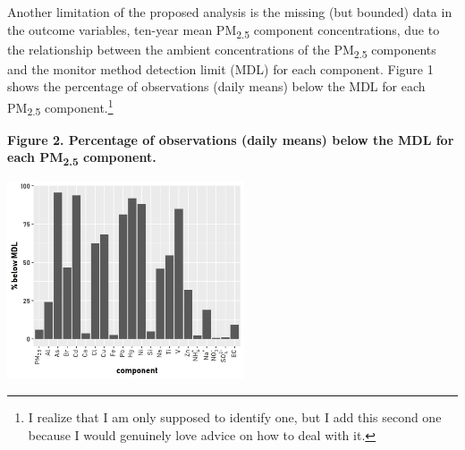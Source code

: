 \documentclass{article}\usepackage[]{graphicx}\usepackage[]{color}
\begin{document}
\begin{enumerate}[label=\textbf{\arabic*.}]
Another limitation of the proposed analysis is the missing (but bounded) data in the outcome variables, ten-year mean PM\textsubscript{2.5} component concentrations, due to the relationship between the ambient concentrations of the PM\textsubscript{2.5} components and the monitor method detection limit (MDL) for each component. Figure 1 shows the percentage of observations (daily means) below the MDL for each PM\textsubscript{2.5} component.\footnote{I realize that I am only supposed to identify one, but I add this second one because I would genuinely love advice on how to deal with it.}

  \textbf{Figure 2. Percentage of observations (daily means) below the MDL for each PM\textsubscript{2.5} component.}

  \includegraphics[height=2.3in]{detectionlimit.jpg}

\end{enumerate}
      
\end{document}
